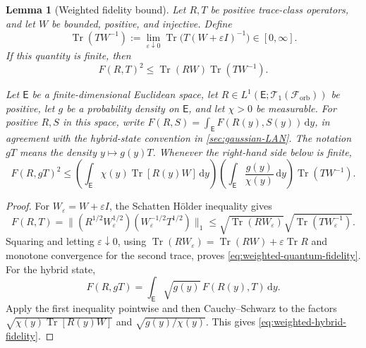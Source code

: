 \documentclass[11pt]{article}
\newtheorem{lemma}[lemma]{Lemma}
\theoremstyle{remark}
\theoremstyle{plain}
\newcommand{\cF}{\mathcal F}
\newcommand{\cT}{\mathcal T}
\newcommand{\dd}{\mathrm d}
\newcommand{\Tr}{\operatorname{Tr}}
\begin{document}
\begin{lemma}[Weighted fidelity bound]\label{lem:weighted-fidelity}
Let \(R,T\) be positive trace-class operators, and let \(W\) be bounded,
positive, and injective.  Define
\[
  \Tr(TW^{-1})
  :=\lim_{\varepsilon\downarrow0}
  \Tr\bigl(T(W+\varepsilon I)^{-1}\bigr)\in[0,\infty].
\]
If this quantity is finite, then
\begin{equation}\label{eq:weighted-quantum-fidelity}
  F(R,T)^2\le\Tr(RW)\Tr(TW^{-1}).
\end{equation}

Let \(\mathsf E\) be a finite-dimensional Euclidean space,
let \(R\in L^1(\mathsf E;\cT_1(\cF_{\mathrm{orb}}))\) be positive, let
\(g\) be a probability density on \(\mathsf E\), and let \(\chi>0\) be
measurable.  For positive \(R,S\) in this space, write
\(F(R,S)=\int_{\mathsf E}F(R(y),S(y))\,\dd y\), in agreement with the
hybrid-state convention in \cref{sec:gaussian-LAN}.
The notation \(gT\) means the density \(y\mapsto g(y)T\).
Whenever the right-hand side below is finite,
\begin{equation}\label{eq:weighted-hybrid-fidelity}
  F(R,gT)^2
  \le
  \left(\int_{\mathsf E}\chi(y)\Tr[R(y)W] \,\dd y\right)
  \left(\int_{\mathsf E}\frac{g(y)}{\chi(y)}\,\dd y\right)
  \Tr(TW^{-1}).
\end{equation}
\end{lemma}

\begin{proof}
For \(W_\varepsilon=W+\varepsilon I\), the Schatten H\"older inequality gives
\[
  F(R,T)
  =\|(R^{1/2}W_\varepsilon^{1/2})(W_\varepsilon^{-1/2}T^{1/2})\|_1
  \le\sqrt{\Tr(RW_\varepsilon)}\sqrt{\Tr(TW_\varepsilon^{-1})}.
\]
Squaring and letting \(\varepsilon\downarrow0\), using
\(\Tr(RW_\varepsilon)=\Tr(RW)+\varepsilon\Tr R\) and monotone convergence
for the second trace, proves \eqref{eq:weighted-quantum-fidelity}.  For the
hybrid state,
\[
  F(R,gT)
  =\int_{\mathsf E}\sqrt{g(y)}\,F(R(y),T)\,\dd y.
\]
Apply the first inequality pointwise and then Cauchy--Schwarz to the factors
\(\sqrt{\chi(y)\Tr[R(y)W]}\) and
\(\sqrt{g(y)/\chi(y)}\).  This gives
\eqref{eq:weighted-hybrid-fidelity}.
\end{proof}
\end{document}

